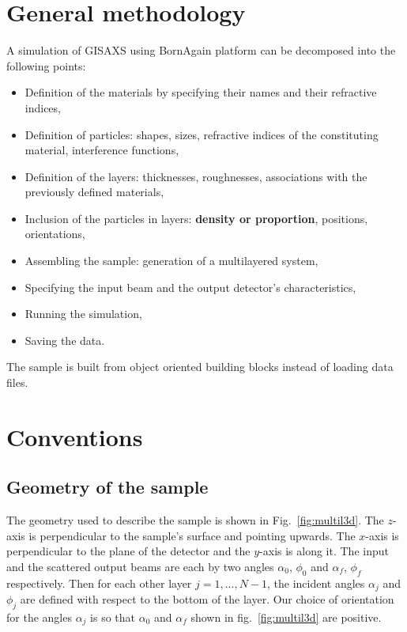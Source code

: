 \section{General methodology}
A simulation of GISAXS using BornAgain platform can be decomposed into the following points:
\begin{itemize}
\item Definition of the materials by specifying their names and their
  refractive indices,
\item Definition of particles: shapes, sizes, refractive indices of
  the constituting material, interference functions,
\item Definition of the layers: thicknesses, roughnesses, associations with the previously defined
materials,
\item Inclusion of the particles in layers: \textbf{density or proportion}, positions, orientations, 
\item Assembling the sample: generation of a multilayered system,
\item Specifying the input beam and the output detector's
  characteristics,
\item Running the simulation,
\item Saving the data.
\end{itemize}

\noindent The sample is built from object oriented building blocks instead of loading data files.

\section{Conventions}

\subsection{Geometry of the sample}

\noindent The geometry used to describe the sample is shown in
Fig.~\ref{fig:multil3d}. The $z$-axis is perpendicular to the sample's
surface and pointing upwards. The $x$-axis  is perpendicular to the
plane of the detector and the $y$-axis is along it. The input and the scattered output beams are each by two angles
$\alpha_0$, $\phi_0$ and $\alpha_f$, $\phi_f$ respectively. Then for each other layer
$j=1,..., N-1$, the incident angles $\alpha_j$ and $\phi_j$  are defined with
respect to the bottom of the layer. Our choice of orientation for the
angles $\alpha_j$ is so that $\alpha_0$ and $\alpha_f$ shown in fig.~\ref{fig:multil3d}  are positive. \\


